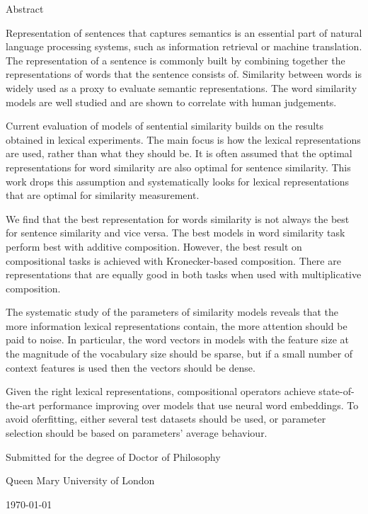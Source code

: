 {\Large \headingfont \thetitle}

\vspace{1em}

{\large \headingfont \theauthor}

\vspace{1em}

{\headingfont Abstract}

Representation of sentences that captures semantics is an essential part of natural language processing systems, such as information retrieval or machine translation. The representation of a sentence is commonly built by combining together the representations of words that the sentence consists of. Similarity between words is widely used as a proxy to evaluate semantic representations. The word similarity models are well studied and are shown to correlate with human judgements.

Current evaluation of models of sentential similarity builds on the results obtained in lexical experiments. The main focus is how the lexical representations are used, rather than what they should be. It is often assumed that the optimal representations for word similarity are also optimal for sentence similarity. This work drops this assumption and systematically looks for lexical representations that are optimal for similarity measurement.

We find that the best representation for words similarity is not always the best for sentence similarity and vice versa. The best models in word similarity task perform best with additive composition. However, the best result on compositional tasks is achieved with Kronecker-based composition. There are representations that are equally good in both tasks when used with multiplicative composition.

The systematic study of the parameters of similarity models reveals that the more information lexical representations contain, the more attention should be paid to noise. In particular, the word vectors in models with the feature size at the magnitude of the vocabulary size should be sparse, but if a small number of context features is used then the vectors should be dense.

Given the right lexical representations, compositional operators achieve state-of-the-art performance improving over models that use neural word embeddings. To avoid oferfitting, either several test datasets should be used, or parameter selection should be based on parameters' average behaviour.

\vfill


Submitted for the degree of Doctor of Philosophy

Queen Mary University of London

\today


